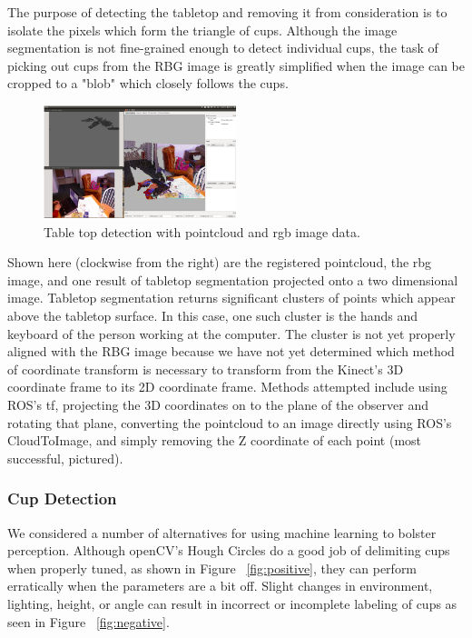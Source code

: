 \documentclass[letterpaper, 10 pt, conference]{ieeeconf}  %
\begin{document}
The purpose of detecting the tabletop and removing it from consideration is to isolate the pixels which form the triangle of cups.  Although the image segmentation is not fine-grained enough to detect individual cups, the task of picking out cups from the RBG image is greatly simplified when the image can be cropped to a "blob" which closely follows the cups.

\begin{figure}[thpb]
      \centering
	  \includegraphics[width = 0.5\textwidth]{detect}
      \caption{Table top detection with pointcloud and rgb image data.}
      \label{fig:detect}
\end{figure}

Shown here (clockwise from the right) are the registered pointcloud, the rbg image, and one result of tabletop segmentation projected onto a two dimensional image.  Tabletop segmentation returns significant clusters of points which appear above the tabletop surface.  In this case, one such cluster is the hands and keyboard of the person working at the computer.  The cluster is not yet properly aligned with the RBG image because we have not yet determined which method of coordinate transform is necessary to transform from the Kinect's 3D coordinate frame to its 2D coordinate frame.  Methods attempted include using ROS's tf, projecting the 3D coordinates on to the plane of the observer and rotating that plane, converting the pointcloud to an image directly using ROS's CloudToImage, and simply removing the Z coordinate of each point (most successful, pictured).


\subsubsection{Cup Detection}

We considered a number of alternatives for using machine learning to bolster perception.  Although openCV’s Hough Circles do a good job of delimiting cups when properly tuned, as shown in Figure ~\ref{fig:positive}, they can perform erratically when the parameters are a bit off.  Slight changes in environment, lighting, height, or angle can result in incorrect or incomplete labeling of cups as seen in Figure ~\ref{fig:negative}.
\end{document}
